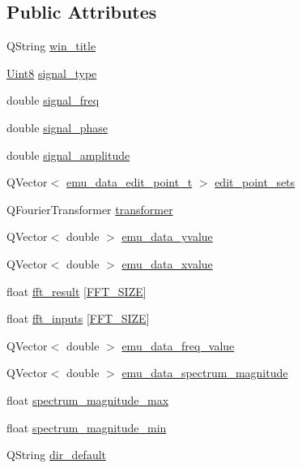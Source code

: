 \subsection*{Public Attributes}
\begin{DoxyCompactItemize}
\item 
Q\+String \hyperlink{a00004_a2abdde44f37258778dcc571e8cc7ed1a}{win\+\_\+title}
\item 
\hyperlink{a00001_a979e3e23b9a449e69ab6a8a83b6042f8}{Uint8} \hyperlink{a00004_a070edaec5aee6ba1f5a6866bc32c8ce4}{signal\+\_\+type}
\item 
double \hyperlink{a00004_a67039999d520fc483fab521fae5ddde4}{signal\+\_\+freq}
\item 
double \hyperlink{a00004_af08de88fdfe283086e3cca97a2965678}{signal\+\_\+phase}
\item 
double \hyperlink{a00004_a73dabe63bd74afe2776e8136211dc36e}{signal\+\_\+amplitude}
\item 
Q\+Vector$<$ \hyperlink{a00001_dc/ddf/a00067}{emu\+\_\+data\+\_\+edit\+\_\+point\+\_\+t} $>$ \hyperlink{a00004_ab093b86d07b4eb96c36878089a7d97df}{edit\+\_\+point\+\_\+sets}
\item 
Q\+Fourier\+Transformer \hyperlink{a00004_a0d6e12337ef942452edea37827e58cd4}{transformer}
\item 
Q\+Vector$<$ double $>$ \hyperlink{a00004_ad922d05d1e988d84f404c115fe909f72}{emu\+\_\+data\+\_\+yvalue}
\item 
Q\+Vector$<$ double $>$ \hyperlink{a00004_a66d07ec51f26cd9b84994548faa336d6}{emu\+\_\+data\+\_\+xvalue}
\item 
float \hyperlink{a00004_a63b6150bfbba86ba943877a2f547ddd8}{fft\+\_\+result} \mbox{[}\hyperlink{a00036_a636ddc19af00bc87969a07c88331f105}{F\+F\+T\+\_\+\+S\+I\+Z\+E}\mbox{]}
\item 
float \hyperlink{a00004_a8782fc20094d65d56c04869b9692902e}{fft\+\_\+inputs} \mbox{[}\hyperlink{a00036_a636ddc19af00bc87969a07c88331f105}{F\+F\+T\+\_\+\+S\+I\+Z\+E}\mbox{]}
\item 
Q\+Vector$<$ double $>$ \hyperlink{a00004_a62129d59e218ab857cd50cb202205129}{emu\+\_\+data\+\_\+freq\+\_\+value}
\item 
Q\+Vector$<$ double $>$ \hyperlink{a00004_ac3c515466f79ab8e60a58e8d15a3b991}{emu\+\_\+data\+\_\+spectrum\+\_\+magnitude}
\item 
float \hyperlink{a00004_ae0119c7dd2179cdcb3ea37adbefdc289}{spectrum\+\_\+magnitude\+\_\+max}
\item 
float \hyperlink{a00004_afb692cc49c350d4bf120ca1e3dd61e93}{spectrum\+\_\+magnitude\+\_\+min}
\item 
Q\+String \hyperlink{a00004_aa55b7d8008e31fcc971692b493e7cf34}{dir\+\_\+default}
\end{DoxyCompactItemize}

